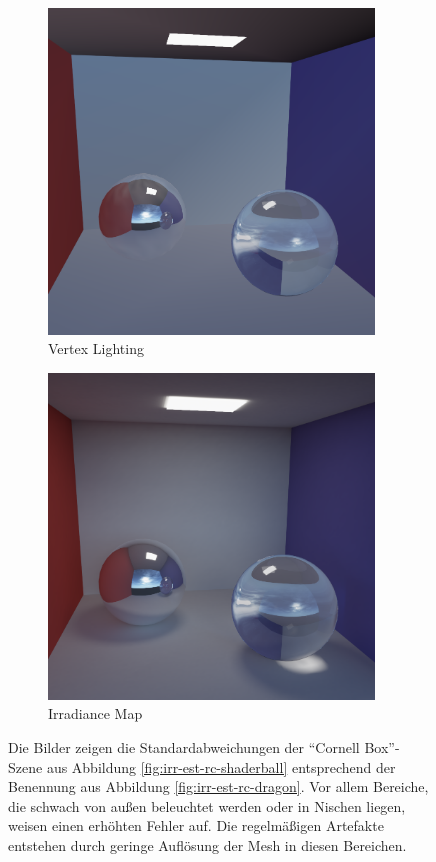 \begin{figure}[h]
\begin{subfigure}[b]{0.33\textwidth}
			\includegraphics[width=0.95\textwidth]{pic/irrmap-cornell-vmap.png}
			\caption{Vertex Lighting}
		\end{subfigure}
		\begin{subfigure}[b]{0.33\textwidth}
			\center
			\includegraphics[width=0.95\textwidth]{pic/irrmap-cornell-irrmap.png}
			\caption{Irradiance Map}
		\end{subfigure}
		\caption[Irradiance-Map anhand der \enquote{Cornell Box}-Szene]{Die Bilder zeigen die Standardabweichungen der \enquote{Cornell Box}-Szene aus Abbildung \ref{fig:irr-est-rc-shaderball} entsprechend der Benennung aus Abbildung \ref{fig:irr-est-rc-dragon}. Vor allem Bereiche, die schwach von außen beleuchtet werden oder in Nischen liegen, weisen einen erhöhten Fehler auf. Die regelmäßigen Artefakte entstehen durch geringe Auflösung der Mesh in diesen Bereichen.}
		\label{fig:irr-map-cornell}
	\end{figure}

